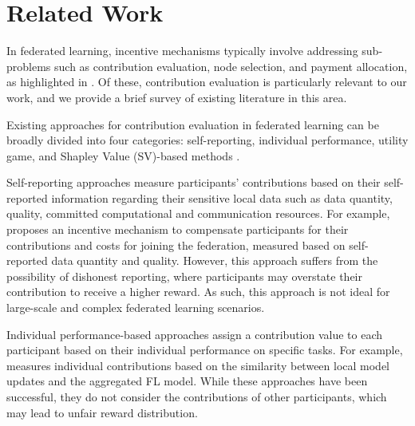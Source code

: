 \documentclass{article}
\begin{document}

\section{Related Work}
In federated learning, incentive mechanisms typically involve addressing sub-problems such as contribution evaluation, node selection, and payment allocation, as highlighted in \cite{zeng2021comprehensive}. Of these, contribution evaluation is particularly relevant to our work, and we provide a brief survey of existing literature in this area.

Existing approaches for contribution evaluation in federated learning can be broadly divided into four categories: self-reporting, individual performance, utility game, and Shapley Value (SV)-based methods \cite{zeng2021comprehensive}.

Self-reporting approaches \cite{yu2020sustainable,zeng2020fmore,zhang2020hierarchically,ding2020incentive,feng2019joint} measure participants' contributions based on their self-reported information regarding their sensitive local data such as data quantity, quality, committed computational and communication resources. For example, \cite{yu2020sustainable} proposes an incentive mechanism to compensate participants for their contributions and costs for joining the federation, measured based on self-reported data quantity and quality. However, this approach suffers from the possibility of dishonest reporting, where participants may overstate their contribution to receive a higher reward. As such, this approach is not ideal for large-scale and complex federated learning scenarios.

Individual performance-based approaches \cite{zhao2021crowdsensing,lyu2020collaborative,pandey2020crowdsourcing} assign a contribution value to each participant based on their individual performance on specific tasks. For example, \cite{zhao2021crowdsensing} measures individual contributions based on the similarity between local model updates and the aggregated FL model. While these approaches have been successful, they do not consider the contributions of other participants, which may lead to unfair reward distribution. 
\end{document}
